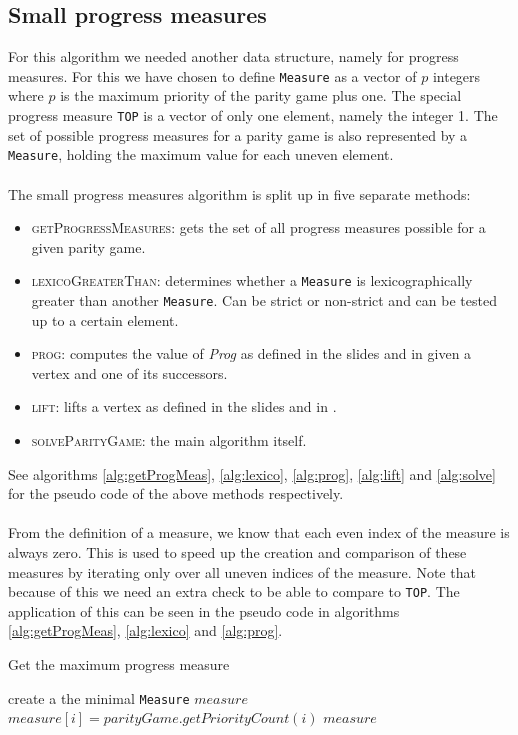 \documentclass[10pt,a4paper]{article}
\newcommand{\algoname}[1]{\textnormal{\textsc{#1}}}
\begin{document}
\subsection{Small progress measures}
For this algorithm we needed another data structure, namely for progress measures. For this we have chosen to define \texttt{Measure} as a vector of $p$ integers where $p$ is the maximum priority of the parity game plus one. The special progress measure \texttt{TOP} is a vector of only one element, namely the integer 1. The set of possible progress measures for a parity game is also represented by a \texttt{Measure}, holding the maximum value for each uneven element.
\\\\
The small progress measures algorithm is split up in five separate methods:
\begin{itemize}
\item \algoname{getProgressMeasures}: gets the set of all progress measures possible for a given parity game.
\item \algoname{lexicoGreaterThan}: determines whether a \texttt{Measure} is lexicographically greater than another \texttt{Measure}. Can be strict or non-strict and can be tested up to a certain element.
\item \algoname{prog}: computes the value of \textit{Prog} as defined in the slides and in \cite{spmpaper} given a vertex and one of its successors.
\item \algoname{lift}: lifts a vertex as defined in the slides and in \cite{spmpaper}.
\item \algoname{solveParityGame}: the main algorithm itself.
\end{itemize}
See algorithms \ref{alg:getProgMeas}, \ref{alg:lexico}, \ref{alg:prog}, \ref{alg:lift} and \ref{alg:solve} for the pseudo code of the above methods respectively.
\\\\
From the definition of a measure, we know that each even index of the measure is always zero. This is used to speed up the creation and comparison of these measures by iterating only over all uneven indices of the measure. Note that because of this we need an extra check to be able to compare to \texttt{TOP}. The application of this can be seen in the pseudo code in algorithms \ref{alg:getProgMeas}, \ref{alg:lexico} and \ref{alg:prog}.

\begin{algorithm}
\caption{Get the maximum progress measure}\label{alg:getProgMeas}
\begin{algorithmic}[1]
		\State create a the minimal \texttt{Measure} $measure$		
			\State $measure[i] = parityGame.getPriorityCount(i)$
		\EndFor
		\State \Return $measure$
	\EndProcedure
\end{algorithmic}
\end{algorithm}
\end{document}
